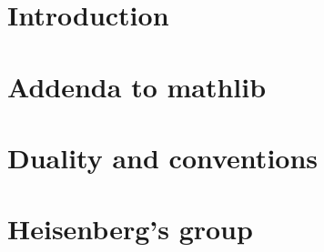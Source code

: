 %

\chapter*{Introduction}
    

\chapter{Addenda to mathlib}
    

\chapter{Duality and conventions}
    

\chapter{Heisenberg's group}
    